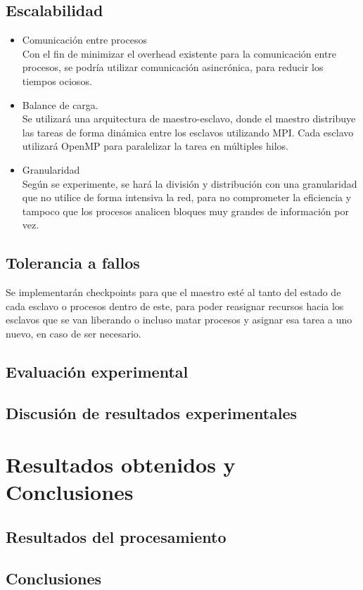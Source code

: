 \documentclass[journal]{IEEEtran}
\begin{document}
\subsection{Escalabilidad}
\begin{itemize}
\item Comunicación entre procesos\\
Con el fin de minimizar el overhead existente para la comunicación entre procesos, se podría utilizar comunicación asincrónica, para reducir los tiempos ociosos. 
\item Balance de carga.\\
Se utilizará una arquitectura de maestro-esclavo, donde el maestro distribuye las tareas de forma dinámica entre los esclavos utilizando MPI. Cada esclavo utilizará OpenMP para paralelizar la tarea en múltiples hilos. 
\item Granularidad\\
Según se experimente, se hará la división y distribución con una granularidad que no utilice de forma intensiva la red, para no comprometer la eficiencia y tampoco que los procesos analicen bloques muy grandes de información por vez.
\end{itemize}

\subsection{Tolerancia a fallos}
Se implementarán checkpoints para que el maestro esté al tanto del estado de cada esclavo o procesos dentro de este, para poder reasignar recursos hacia los esclavos que se van liberando o incluso matar procesos y asignar esa tarea a uno nuevo, en caso de ser necesario.
\subsection{Evaluación experimental}
\subsection{Discusión de resultados experimentales}
\section{Resultados obtenidos y Conclusiones}
\subsection{Resultados del procesamiento}
\subsection{Conclusiones}
\end{document}
